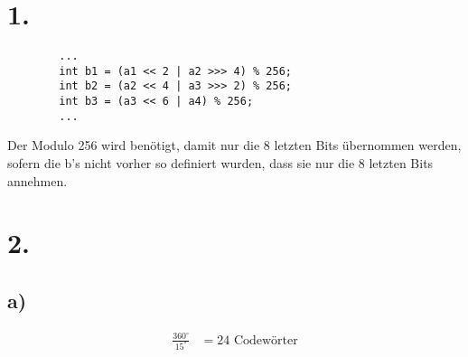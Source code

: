 \documentclass[a4paper]{scrartcl}
\title{\titleinfo}
\author{Tronje Krabbe 6435002, The-Vinh Jackie Huynh 6388888,\\Arne Struck 6326505}
\date{\today}
\begin{document}
\maketitle
\notag
\section{1.}
	\begin{lstlisting}
		...
		int b1 = (a1 << 2 | a2 >>> 4) % 256;
		int b2 = (a2 << 4 | a3 >>> 2) % 256;
		int b3 = (a3 << 6 | a4) % 256;
		...
	\end{lstlisting}
	Der Modulo 256 wird benötigt, damit nur die 8 letzten Bits übernommen werden, sofern die b's 
	nicht vorher so definiert wurden, dass sie nur die 8 letzten Bits annehmen.
	

\section{2.}
	\subsection{a)}
		\begin{align}
			\frac{360^{\circ}}{15^{\circ}} &= 24 \text{ Codewörter} 
		\end{align}
		
\end{document}

